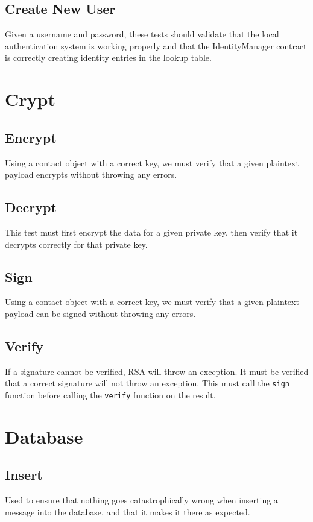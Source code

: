 \documentclass[titlepage]{report}
\begin{document}
\subsection{Create New User}
Given a username and password, these tests should validate that the local authentication system is working properly and that the IdentityManager contract is correctly creating identity entries in the lookup table.

\section{Crypt}
\subsection{Encrypt}
Using a contact object with a correct key, we must verify that a given plaintext payload encrypts without throwing any errors.
\subsection{Decrypt}
This test must first encrypt the data for a given \gls{private key}, then verify that it decrypts correctly for that \gls{private key}.
\subsection{Sign}
Using a contact object with a correct key, we must verify that a given plaintext payload can be signed without throwing any errors.
\subsection{Verify}
If a signature cannot be verified, RSA will throw an exception. It must be verified that a correct signature will not throw an exception. This must call the \texttt{sign} function before calling the \texttt{verify} function on the result.

\section{Database}
\subsection{Insert}
Used to ensure that nothing goes catastrophically wrong when inserting a message into the database, and that it makes it there as expected.
\end{document}
